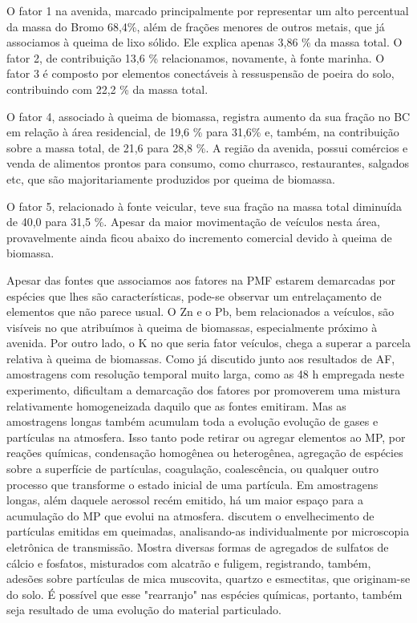 O fator 1 na avenida, marcado principalmente por representar um alto percentual 
da massa do Bromo 68,4\%, além de frações menores de outros metais,
 que já associamos à queima de lixo sólido. Ele explica apenas 3,86 \% da 
massa total. O fator 2, de contribuição 13,6 \% relacionamos, novamente, 
à fonte marinha. O fator 3 é composto por elementos conectáveis à ressuspensão 
de poeira do solo, contribuindo com 22,2 \% da massa total. 

O fator 4, associado à queima de biomassa, registra aumento da sua fração no BC
em relação à área residencial, de 19,6 \% para 31,6\% e, também, na contribuição
sobre a massa total, de 21,6 para 28,8 \%. A região da avenida, possui comércios
e venda de alimentos prontos para consumo, como churrasco, restaurantes, 
salgados etc, que são majoritariamente produzidos por queima de biomassa. 

O fator 5, relacionado à fonte veicular, teve sua fração na massa total 
diminuída de 40,0 para 31,5 \%. Apesar da maior movimentação de veículos nesta 
área, provavelmente ainda ficou abaixo do incremento comercial devido à 
queima de biomassa.

Apesar das fontes que associamos aos fatores na PMF estarem demarcadas por 
espécies que lhes são características, pode-se observar um entrelaçamento de 
elementos que não parece usual. O Zn e o Pb, bem relacionados a veículos, 
são visíveis no que atribuímos à queima de biomassas, especialmente próximo à 
avenida. Por outro lado, o K no que seria fator veículos, chega a superar a 
parcela relativa à queima de biomassas.
Como já discutido junto aos resultados de AF, amostragens com resolução 
temporal muito larga, como as 48 h empregada neste experimento, dificultam a 
demarcação dos fatores por promoverem uma mistura relativamente homogeneizada 
daquilo que as fontes emitiram.
Mas as amostragens longas também acumulam toda a evolução evolução de gases e 
partículas na atmosfera. Isso tanto pode retirar ou agregar elementos ao MP, 
por reações químicas, condensação homogênea ou heterogênea, agregação de 
espécies sobre a superfície de partículas, coagulação, coalescência, ou 
qualquer outro processo que transforme o estado inicial de uma partícula. 
Em amostragens longas, além daquele aerossol recém emitido, há um maior espaço 
para a acumulação do MP que evolui na atmosfera. 
\citet{li2003} discutem o envelhecimento de partículas emitidas em queimadas, 
analisando-as individualmente por microscopia eletrônica de transmissão. 
Mostra diversas formas de agregados de sulfatos de cálcio e fosfatos, 
misturados com alcatrão e fuligem, registrando, também, adesões sobre partículas 
de mica muscovita, quartzo e esmectitas, que originam-se do solo. É possível que
esse "rearranjo" nas espécies químicas, portanto, também seja resultado de uma 
evolução do material particulado.

